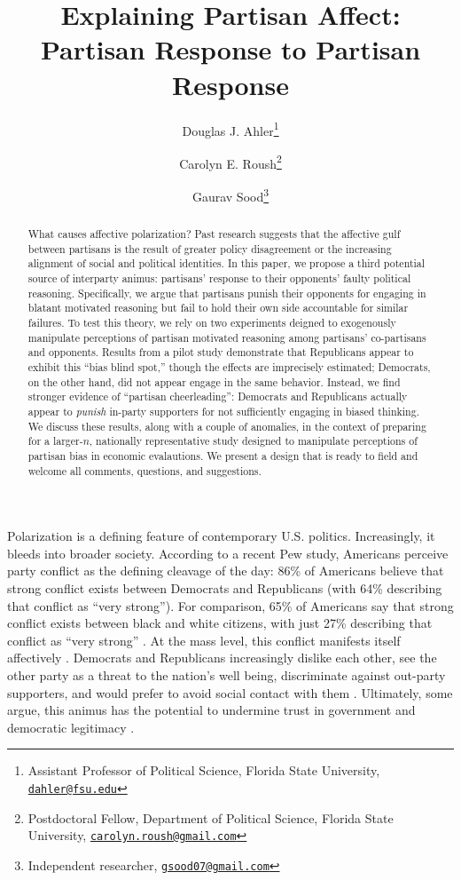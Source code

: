 \documentclass[12pt, letterpaper]{article}
\title{Explaining Partisan Affect: Partisan Response to Partisan Response}
\author{Douglas J. Ahler\thanks{Assistant Professor of Political Science, Florida State University, \href{mailto:dahler@fsu.edu}{\texttt{dahler@fsu.edu}}} \and Carolyn E. Roush\thanks{Postdoctoral Fellow, Department of Political Science, Florida State University, \href{mailto:carolyn.roush@gmail.com}{\texttt{carolyn.roush@gmail.com}}} \and Gaurav Sood\thanks{Independent researcher, \href{gsood07@gmail.com}{\texttt{gsood07@gmail.com}}}}
\begin{document}
\maketitle
\thispagestyle{empty}

\begin{abstract}

\noindent What causes affective polarization? Past research suggests that the affective gulf between partisans is the result of greater policy disagreement or the increasing alignment of social and political identities. In this paper, we propose a third potential source of interparty animus: partisans' response to their opponents' faulty political reasoning. Specifically, we argue that partisans punish their opponents for engaging in blatant motivated reasoning but fail to hold their own side accountable for similar failures. To test this theory, we rely on two experiments deigned to exogenously manipulate perceptions of partisan motivated reasoning among partisans' co-partisans and opponents. Results from a pilot study demonstrate that Republicans appear to exhibit this ``bias blind spot,'' though the effects are imprecisely estimated; Democrats, on the other hand, did not appear engage in the same behavior. Instead, we find stronger evidence of ``partisan cheerleading'': Democrats and Republicans actually appear to \textit{punish} in-party supporters for not sufficiently engaging in biased thinking.  We discuss these results, along with a couple of anomalies, in the context of preparing for a larger-$n$, nationally representative study designed to manipulate perceptions of partisan bias in economic evalautions. We present a design that is ready to field and welcome all comments, questions, and suggestions. 

\end{abstract}

\newpage

\doublespacing
Polarization is a defining feature of contemporary U.S. politics. Increasingly, it bleeds into broader society. According to a recent Pew study, Americans perceive party conflict as the defining cleavage of the day: 86\% of Americans believe that strong conflict exists between Democrats and Republicans (with 64\% describing that conflict as ``very strong''). For comparison, 65\% of Americans say that strong conflict exists between black and white citizens, with just 27\% describing that conflict as ``very strong'' \citep{pew2018far}. At the mass level, this conflict manifests itself affectively \citep{IyengarSoodLelkes2012}. Democrats and Republicans increasingly dislike each other, see the other party as a threat to the nation's well being, discriminate against out-party supporters, and would prefer to avoid social contact with them \citep{pew_polarization}. Ultimately, some argue, this animus has the potential to undermine trust in government and democratic legitimacy \citep{hetheringtonrudolph_2015}.
\end{document}
